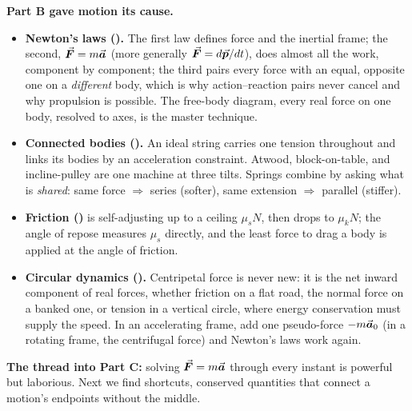 \textbf{Part B gave motion its cause.}
\begin{itemize}
\item \textbf{Newton's laws ().} The first law defines force and the inertial frame; the second,
$\vec{\bm{F}}=m\vec{\bm{a}}$ (more generally $\vec{\bm{F}}=d\vec{\bm{p}}/dt$), does almost all the work, component by component; the third pairs every
force with an equal, opposite one on a \emph{different} body, which is why action--reaction pairs never
cancel and why propulsion is possible. The free-body diagram, every real force on one body, resolved to
axes, is the master technique.
\item \textbf{Connected bodies ().} An ideal string carries one tension throughout and links its
bodies by an acceleration constraint. Atwood, block-on-table, and incline-pulley are one machine at three
tilts. Springs combine by asking what is \emph{shared}: same force $\Rightarrow$ series (softer), same
extension $\Rightarrow$ parallel (stiffer).
\item \textbf{Friction ()} is self-adjusting up to a ceiling $\mu_s N$, then drops to $\mu_k N$; the
angle of repose measures $\mu_s$ directly, and the least force to drag a body is applied at the angle of
friction.
\item \textbf{Circular dynamics ().} Centripetal force is never new: it is the net inward
component of real forces, whether friction on a flat road, the normal force on a banked one, or tension
in a vertical circle, where energy conservation must supply the speed. In an accelerating frame, add one
pseudo-force $-m\vec{\bm{a}}_0$ (in a rotating frame, the centrifugal force) and Newton's laws work again.
\end{itemize}
\textbf{The thread into Part C:} solving $\vec{\bm{F}}=m\vec{\bm{a}}$ through every instant is powerful but laborious. Next
we find shortcuts, conserved quantities that connect a motion's endpoints without the middle.
